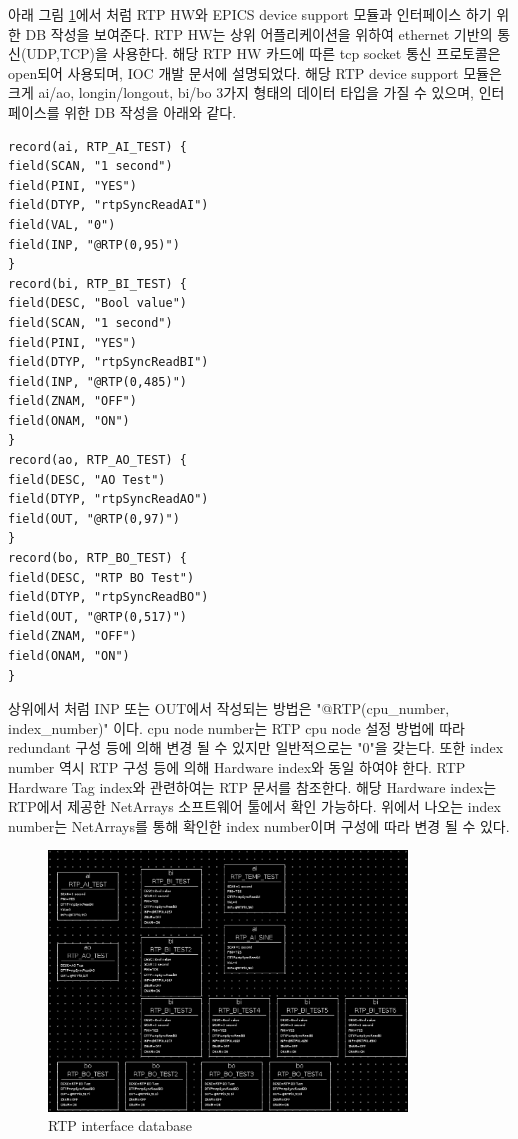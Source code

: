 \documentclass[11pt
  , a4paper
  , article
  , oneside
]{memoir}
\begin{document}
아래 그림 \ref{fig:rtp_db}에서 처럼 RTP HW와 EPICS device support 모듈과 인터페이스 하기 위한 DB 작성을 보여준다. RTP HW는 상위 어플리케이션을 위하여 ethernet 기반의 통신(UDP,TCP)을 사용한다. 해당 RTP HW 카드에 따른 tcp socket 통신 프로토콜은 open되어 사용되며, IOC 개발 문서에 설명되었다. 해당 RTP device support 모듈은 크게 ai/ao, longin/longout, bi/bo 3가지 형태의 데이터 타입을 가질 수 있으며, 인터페이스를 위한 DB 작성을 아래와 같다.

\begin{lstlisting}[style=termstyle]
record(ai, RTP_AI_TEST) {
field(SCAN, "1 second")
field(PINI, "YES")
field(DTYP, "rtpSyncReadAI")
field(VAL, "0")
field(INP, "@RTP(0,95)")
}
record(bi, RTP_BI_TEST) {
field(DESC, "Bool value")
field(SCAN, "1 second")
field(PINI, "YES")
field(DTYP, "rtpSyncReadBI")
field(INP, "@RTP(0,485)")
field(ZNAM, "OFF")
field(ONAM, "ON")
}
record(ao, RTP_AO_TEST) {
field(DESC, "AO Test")
field(DTYP, "rtpSyncReadAO")
field(OUT, "@RTP(0,97)")
}
record(bo, RTP_BO_TEST) {
field(DESC, "RTP BO Test")
field(DTYP, "rtpSyncReadBO")
field(OUT, "@RTP(0,517)")
field(ZNAM, "OFF")
field(ONAM, "ON")
}
\end{lstlisting}

상위에서 처럼 INP 또는 OUT에서 작성되는 방법은 "@RTP(cpu\_number, index\_number)" 이다. cpu node number는 RTP cpu node 설정 방법에 따라 redundant 구성 등에 의해 변경 될 수 있지만 일반적으로는 "0"을 갖는다. 또한 index number 역시 RTP 구성 등에 의해 Hardware index와 동일 하여야 한다. RTP Hardware Tag index와 관련하여는 RTP 문서를 참조한다. 해당 Hardware index는 RTP에서 제공한 NetArrays 소프트웨어 툴에서 확인 가능하다. 위에서 나오는 index number는 NetArrays를 통해 확인한 index number이며 구성에 따라 변경 될 수 있다.

\begin{figure}[h!]
	\centering
	\includegraphics[width=0.85\textwidth]{./images/rtp_db.eps}
	\caption{RTP interface database}
	\label{fig:rtp_db}
\end{figure}
\end{document}
